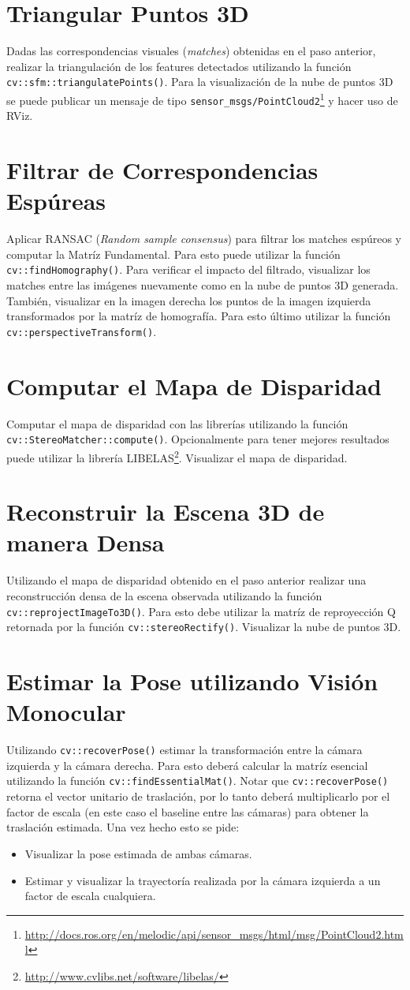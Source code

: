 \documentclass[tp]{lcc}
\begin{document}
\section{Triangular Puntos 3D}
Dadas las correspondencias visuales (\emph{matches}) obtenidas en el paso anterior, realizar la triangulación de los features detectados utilizando la función \lstinline{cv::sfm::triangulatePoints()}. Para la visualización de la nube de puntos 3D se puede publicar un mensaje de tipo \lstinline{sensor_msgs/PointCloud2}\footnote{\url{http://docs.ros.org/en/melodic/api/sensor_msgs/html/msg/PointCloud2.html}} y hacer uso de RViz.

\section{Filtrar de Correspondencias Espúreas}
Aplicar RANSAC (\emph{Random sample consensus}) para filtrar los matches espúreos y computar la Matríz Fundamental. Para esto puede utilizar la función \lstinline{cv::findHomography()}. Para verificar el impacto del filtrado, visualizar los matches entre las imágenes nuevamente como en la nube de puntos 3D generada. También, visualizar en la imagen derecha los puntos de la imagen izquierda transformados por la matríz de homografía. Para esto último utilizar la función  \lstinline{cv::perspectiveTransform()}.

\section{Computar el Mapa de Disparidad}
Computar el mapa de disparidad con las librerías utilizando la función \lstinline{cv::StereoMatcher::compute()}. Opcionalmente para tener mejores resultados puede utilizar la librería LIBELAS\footnote{\url{http://www.cvlibs.net/software/libelas/}}. Visualizar el mapa de disparidad.

\section{Reconstruir la Escena 3D de manera Densa}
Utilizando el mapa de disparidad obtenido en el paso anterior realizar una reconstrucción densa de la escena observada utilizando la función \lstinline{cv::reprojectImageTo3D()}. Para esto debe utilizar la matríz de reproyección Q retornada por la función \lstinline{cv::stereoRectify()}. Visualizar la nube de puntos 3D.

\section{Estimar la Pose utilizando Visión Monocular}
Utilizando \lstinline{cv::recoverPose()} estimar la transformación entre la cámara izquierda y la cámara derecha. Para esto deberá calcular la matríz esencial utilizando la función \lstinline{cv::findEssentialMat()}. Notar que \lstinline{cv::recoverPose()} retorna el vector unitario de traslación, por lo tanto deberá multiplicarlo por el factor de escala (en este caso el baseline entre las cámaras) para obtener la traslación estimada. Una vez hecho esto se pide:

\begin{itemize}
    \item Visualizar la pose estimada de ambas cámaras.
    \item Estimar y visualizar la trayectoría realizada por la cámara izquierda a un factor de escala cualquiera.
\end{itemize}
\end{document}
